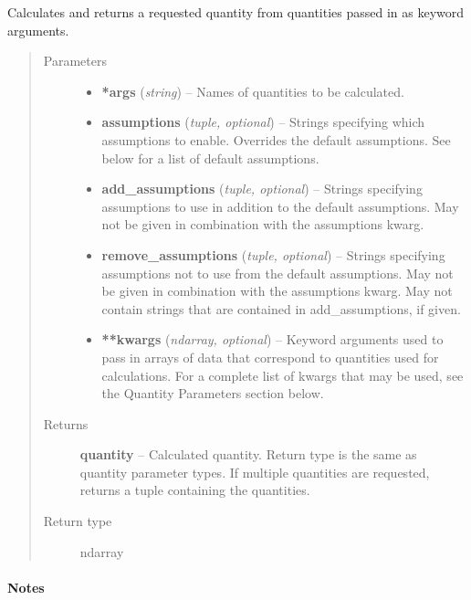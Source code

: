 \documentclass[letterpaper,10pt,english]{sphinxmanual}
\begin{document}
\begin{fulllineitems}
\label{atmos:atmos.solve.calculate}
Calculates and returns a requested quantity from quantities passed in as
keyword arguments.
\begin{quote}\begin{description}
\item[{Parameters}] \leavevmode\begin{itemize}
\item {} 
\textbf{*args} (\emph{string}) -- Names of quantities to be calculated.

\item {} 
\textbf{assumptions} (\emph{tuple, optional}) -- Strings specifying which assumptions to enable. Overrides the default
assumptions. See below for a list of default assumptions.

\item {} 
\textbf{add\_assumptions} (\emph{tuple, optional}) -- Strings specifying assumptions to use in addition to the default
assumptions. May not be given in combination with the assumptions kwarg.

\item {} 
\textbf{remove\_assumptions} (\emph{tuple, optional}) -- Strings specifying assumptions not to use from the default assumptions.
May not be given in combination with the assumptions kwarg. May not
contain strings that are contained in add\_assumptions, if given.

\item {} 
\textbf{**kwargs} (\emph{ndarray, optional}) -- Keyword arguments used to pass in arrays of data that correspond to
quantities used for calculations. For a complete list of kwargs that
may be used, see the Quantity Parameters section below.

\end{itemize}

\item[{Returns}] \leavevmode
\textbf{quantity} --
Calculated quantity.
Return type is the same as quantity parameter types.
If multiple quantities are requested, returns a tuple containing the
quantities.

\item[{Return type}] \leavevmode
ndarray

\end{description}\end{quote}
\paragraph{Notes}


\end{fulllineitems}
\end{document}
